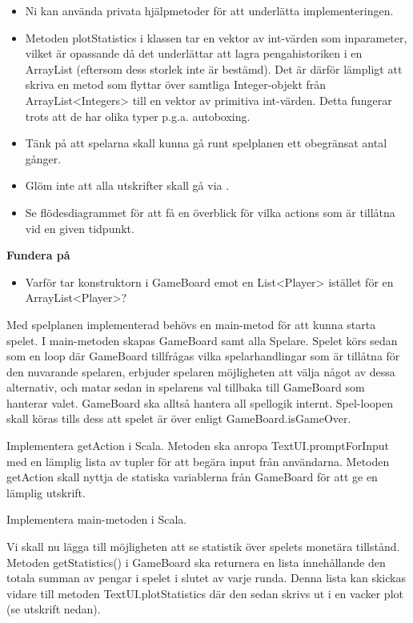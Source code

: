 \begin{itemize}
\item Ni kan använda privata hjälpmetoder för att underlätta implementeringen.
\item Metoden plotStatistics i klassen  tar en vektor av int-värden som inparameter, vilket är opassande då det underlättar att lagra pengahistoriken i en ArrayList (eftersom dess storlek inte är bestämd). Det är därför lämpligt att skriva en metod som flyttar över samtliga Integer-objekt från ArrayList<Integers> till en vektor av primitiva int-värden. Detta fungerar trots att de har olika typer p.g.a. autoboxing. 
\item Tänk på att spelarna skall kunna gå runt spelplanen ett obegränsat antal gånger.
\item Glöm inte att alla utskrifter skall gå via  .
\item Se flödesdiagrammet för att få en överblick för vilka actions som är tillåtna vid en given tidpunkt.
\end{itemize}

\textbf{Fundera på}
\begin{itemize}
\item Varför tar konstruktorn i GameBoard emot en List<Player> istället för en ArrayList<Player>?
\end{itemize}

\Task Med spelplanen implementerad behövs en main-metod för att kunna starta spelet. I main-metoden skapas GameBoard samt alla Spelare. Spelet körs sedan som en loop där GameBoard tillfrågas vilka spelarhandlingar som är tillåtna för den nuvarande spelaren, erbjuder spelaren möjligheten att välja något av dessa alternativ, och matar sedan in spelarens val tillbaka till GameBoard som hanterar valet. GameBoard ska alltså hantera all spellogik internt.  Spel-loopen skall köras tills dess att spelet är över enligt GameBoard.isGameOver. 

\Subtask Implementera getAction i Scala. Metoden ska anropa TextUI.promptForInput med en lämplig lista av tupler för att begära input från användarna. Metoden getAction skall nyttja de statiska variablerna från GameBoard för att ge en lämplig utskrift.

\Subtask Implementera main-metoden i Scala.

\Task Vi skall nu lägga till möjligheten att se statistik över spelets monetära tillstånd. Metoden getStatistics() i GameBoard  ska returnera en lista innehållande den totala summan av pengar i spelet i slutet av varje runda. Denna lista kan skickas vidare till metoden TextUI.plotStatistics där den sedan skrivs ut i en vacker plot (se utskrift nedan). 

